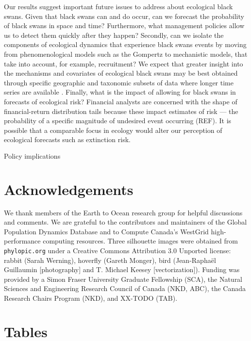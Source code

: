Our results suggest important future issues to address about ecological black
swans. Given that black swans can and do occur, can we forecast the probability
of black swans in space and time? Furthermore, what management policies allow
us to detect them quickly after they happen? Secondly, can we isolate the
components of ecological dynamics that experience black swans events by moving
from phenomenological models such as the Gompertz to mechanistic models, that
take into account, for example, recruitment? We expect that greater insight
into the mechanisms and covariates of ecological black swans may be best
obtained through specific geographic and taxonomic subsets of data where longer
time series are available \citep[e.g.][]{segura2013}. Finally, what is the
impact of allowing for black swans in forecasts of ecological risk? Financial
analysts are concerned with the shape of financial-return distribution tails
because these impact estimates of risk --- the probability of a specific
magnitude of undesired event occurring (REF). It is possible that a comparable
focus in ecology would alter our perception of ecological forecasts such as
extinction risk.

Policy implications

\section{Acknowledgements}

We thank members of the Earth to Ocean research group for helpful discussions
and comments. We are grateful to the contributors and maintainers of the Global
Population Dynamics Database and to Compute Canada's WestGrid high-performance
computing resources. Three silhouette images were obtained from
\texttt{phylopic.org} under a Creative Commons Attribution 3.0 Unported
license: rabbit (Sarah Werning), hoverfly (Gareth Monger), bird (Jean-Raphaël
Guillaumin {[}photography{]} and T. Michael Keesey {[}vectorization{]}).
Funding was provided by a Simon Fraser University Graduate Fellowship (SCA),
the Natural Sciences and Engineering Research Council of Canada (NKD, ABC), the
Canada Research Chairs Program (NKD), and XX-TODO (TAB).




\clearpage

\section{Tables}

